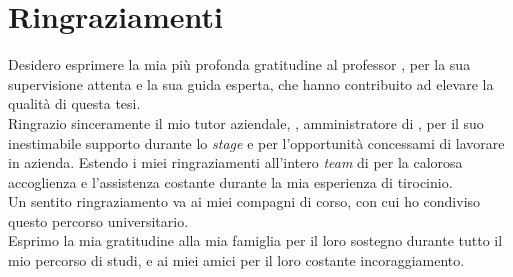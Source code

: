 \chapter*{Ringraziamenti}

Desidero esprimere la mia più profonda gratitudine al professor {\myProf}, per la sua supervisione attenta e la sua
guida esperta, che hanno contribuito ad elevare la qualità di questa tesi.\\
Ringrazio sinceramente il mio tutor aziendale, {\myTutor}, amministratore di {\company}, per il suo inestimabile 
supporto durante lo \textit{stage} e per l'opportunità concessami di lavorare in azienda. Estendo i miei 
ringraziamenti all'intero \textit{team} di {\company} per la calorosa accoglienza e l'assistenza costante 
durante la mia esperienza di tirocinio.\\
Un sentito ringraziamento va ai miei compagni di corso, con cui ho condiviso questo percorso 
universitario.\\
Esprimo la mia gratitudine alla mia famiglia per il loro sostegno durante tutto il mio percorso 
di studi, e ai miei amici per il loro costante incoraggiamento.

\vspace{0.75cm}

\noindent{\myLocation, \myTime}
\hfill \textit{\myName}


